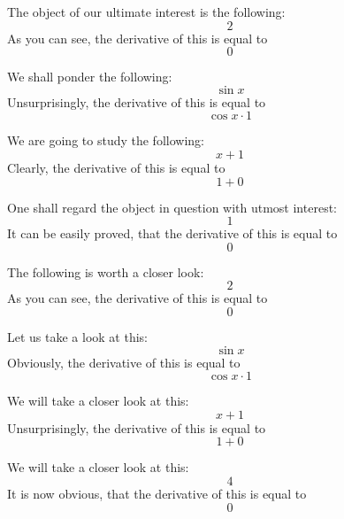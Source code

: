 \documentclass{article}
\begin{document}
The object of our ultimate interest is the following:
\begin{equation}
2 
\end{equation}
As you can see, the derivative of this is equal to
\begin{equation}
0 
\end{equation}

We shall ponder the following:
\begin{equation}
\sin x 
\end{equation}
Unsurprisingly, the derivative of this is equal to
\begin{equation}
\cos x \cdot 1 
\end{equation}

We are going to study the following:
\begin{equation}
x + 1 
\end{equation}
Clearly, the derivative of this is equal to
\begin{equation}
1 + 0 
\end{equation}

One shall regard the object in question with utmost interest:
\begin{equation}
1 
\end{equation}
It can be easily proved, that the derivative of this is equal to
\begin{equation}
0 
\end{equation}

The following is worth a closer look:
\begin{equation}
2 
\end{equation}
As you can see, the derivative of this is equal to
\begin{equation}
0 
\end{equation}

Let us take a look at this:
\begin{equation}
\sin x 
\end{equation}
Obviously, the derivative of this is equal to
\begin{equation}
\cos x \cdot 1 
\end{equation}

We will take a closer look at this:
\begin{equation}
x + 1 
\end{equation}
Unsurprisingly, the derivative of this is equal to
\begin{equation}
1 + 0 
\end{equation}

We will take a closer look at this:
\begin{equation}
4 
\end{equation}
It is now obvious, that the derivative of this is equal to
\begin{equation}
0 
\end{equation}
\end{document}

